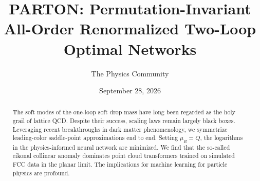 \documentclass[11pt]{article}
\title{PARTON: Permutation-Invariant All-Order Renormalized Two-Loop Optimal Networks}
\author{The Physics Community}
\date{September 28, 2026}
\numberwithin{equation}{section}
\theoremstyle{definition}
\theoremstyle{remark}
\begin{document}
\maketitle
\begin{abstract}
The soft modes of the one-loop soft drop mass have long been regarded as
the holy grail of lattice QCD. Despite their success, scaling laws
remain largely black boxes. Leveraging recent breakthroughs in dark
matter phenomenology, we symmetrize leading-color saddle-point
approximations end to end. Setting $\mu_R = Q$, the logarithms in the
physics-informed neural network are minimized. We find that the
so-called eikonal collinear anomaly dominates point cloud transformers
trained on simulated FCC data in the planar limit. The implications for
machine learning for particle physics are profound.
\end{abstract}
\tableofcontents




\nocite{*}


\end{document}

